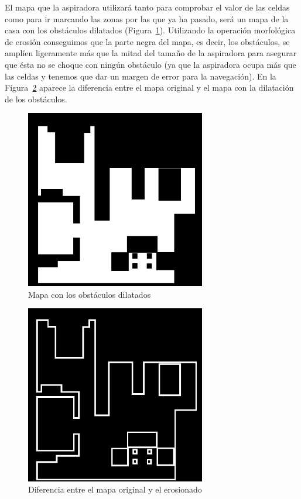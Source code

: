 El mapa que la aspiradora utilizará tanto para comprobar el valor de las celdas como para ir marcando las zonas por las que ya ha pasado, será un mapa de la casa con los obstáculos dilatados (Figura~\ref{fig.obsDil}). Utilizando la operación morfológica de erosión conseguimos que la parte negra del mapa, es decir, los obstáculos, se amplíen ligeramente más que la mitad del tamaño de la aspiradora para asegurar que ésta no se choque con ningún obstáculo (ya que la aspiradora ocupa más que las celdas y tenemos que dar un margen de error para la navegación). En la Figura~\ref{fig.diff} aparece la diferencia entre el mapa original y el mapa con la dilatación de los obstáculos. 

\begin{figure}[H]
  \begin{center}
    \includegraphics[width=0.7\textwidth]{figures/Vacuum/MapaErosionado.png}
		\caption{Mapa con los obstáculos dilatados}
		\label{fig.obsDil}
		\end{center}
\end{figure}

\begin{figure}[H]
  \begin{center}
    \includegraphics[width=0.7\textwidth]{figures/Vacuum/Diff.png}
		\caption{Diferencia entre el mapa original y el erosionado}
		\label{fig.diff}
		\end{center}
\end{figure}


